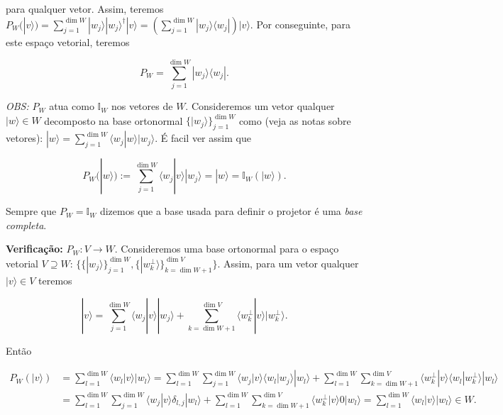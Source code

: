 \documentclass[11pt]{article}
\begin{document}
para qualquer vetor. Assim, teremos
\(P_{W}(|v\rangle) = \sum_{j=1}^{\dim W}|w_{j}\rangle|w_{j}\rangle^{\dagger}|v\rangle = (\sum_{j=1}^{\dim W}|w_{j}\rangle\langle w_{j}|)|v\rangle\).
Por conseguinte, para este espaço vetorial, teremos

\begin{equation}
P_{W} = \sum_{j=1}^{\dim W}|w_{j}\rangle\langle w_{j}|.
\end{equation}

    \emph{OBS:} \(P_{W}\) atua como \(\mathbb{I}_{W}\) nos vetores de \(W\).
Consideremos um vetor qualquer \(|w\rangle\in W\) decomposto na base
ortonormal \(\{|w_{j}\rangle\}_{j=1}^{\dim W}\) como (veja as notas
sobre vetores):
\(|w\rangle=\sum_{j=1}^{\dim W}\langle w_{j}|w\rangle|w_{j}\rangle\). É
facil ver assim que

\begin{equation}
P_{W}(|w\rangle) := \sum_{j=1}^{\dim W}\langle w_{j}|v\rangle|w_{j}\rangle = |w\rangle = \mathbb{I}_{W}(|w\rangle).
\end{equation}

Sempre que \(P_{W}= \mathbb{I}_{W}\) dizemos que a base usada para
definir o projetor é uma \emph{base completa}.

    \textbf{Verificação:} \(P_{W}:V\rightarrow W\). Consideremos uma base
ortonormal para o espaço vetorial \(V\supseteq W\):
\(\{\{|w_{j}\rangle\}_{j=1}^{\dim W},\{|w^{\perp}_{k}\rangle\}_{k=\dim W+1}^{\dim V}\}\).
Assim, para um vetor qualquer \(|v\rangle\in V\) teremos

\begin{equation}
|v\rangle = \sum_{j=1}^{\dim W}\langle w_{j}|v\rangle|w_{j}\rangle + \sum_{k=\dim W+1}^{\dim V}\langle w^{\perp}_{k}|v\rangle|w^{\perp}_{k}\rangle.
\end{equation}

Então

\begin{align}
P_{W}(|v\rangle) & = \sum_{l=1}^{\dim W}\langle w_{l}|v\rangle|w_{l}\rangle = \sum_{l=1}^{\dim W}\sum_{j=1}^{\dim W}\langle w_{j}|v\rangle\langle w_{l}|w_{j}\rangle|w_{l}\rangle + \sum_{l=1}^{\dim W}\sum_{k=\dim W+1}^{\dim V}\langle w^{\perp}_{k}|v\rangle\langle w_{l}|w^{\perp}_{k}\rangle|w_{l}\rangle \\
& = \sum_{l=1}^{\dim W}\sum_{j=1}^{\dim W}\langle w_{j}|v\rangle\delta_{l,j}|w_{l}\rangle + \sum_{l=1}^{\dim W}\sum_{k=\dim W+1}^{\dim V}\langle w^{\perp}_{k}|v\rangle 0|w_{l}\rangle = \sum_{l=1}^{\dim W}\langle w_{l}|v\rangle|w_{l}\rangle \in W.
\end{align}
\end{document}
